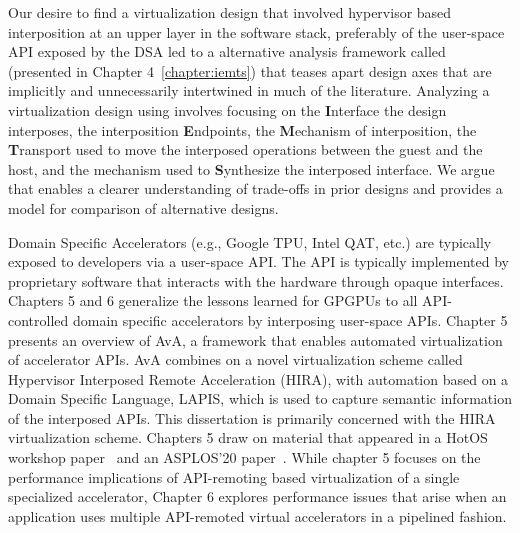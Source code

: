 Our desire to find a virtualization design that involved hypervisor based
interposition at an upper layer in the software stack, preferably of the
user-space API exposed by the DSA led to a alternative analysis framework
called \iemts (presented in Chapter 4~\ref{chapter:iemts}) that teases
apart design axes that are implicitly and unnecessarily intertwined in much of
the literature. Analyzing a virtualization design using \iemts
involves focusing on the \textbf{I}nterface the design interposes, the
interposition \textbf{E}ndpoints, the \textbf{M}echanism of interposition, the
\textbf{T}ransport used to move the interposed operations between the guest
and the host, and the mechanism used to \textbf{S}ynthesize the interposed
interface. We argue that \iemts enables a clearer understanding of
trade-offs in prior designs and provides a model for comparison of alternative
designs.

Domain Specific Accelerators (e.g., Google TPU, Intel QAT, etc.) are
typically exposed to developers via a user-space API. The API is typically
implemented by proprietary software that interacts with the hardware through
opaque interfaces.
Chapters 5 and 6 generalize the lessons learned for GPGPUs to all
API-controlled domain specific accelerators by interposing user-space APIs.
Chapter 5 presents an overview of AvA, a framework that enables automated
virtualization of accelerator APIs. AvA combines on a novel virtualization
scheme called Hypervisor Interposed Remote Acceleration (HIRA), with
automation based on a Domain Specific Language, LAPIS, which is used to
capture semantic information of the interposed APIs. This dissertation is
primarily concerned with the HIRA virtualization scheme.
Chapters 5 draw on material that appeared in a HotOS workshop
paper~\cite{ava-hotos} and an ASPLOS'20 paper~\cite{ava-asplos}.
While chapter 5 focuses on the performance implications of API-remoting based
virtualization of a single specialized accelerator, Chapter 6 explores
performance issues that arise when an application uses multiple API-remoted
virtual accelerators in a pipelined fashion.